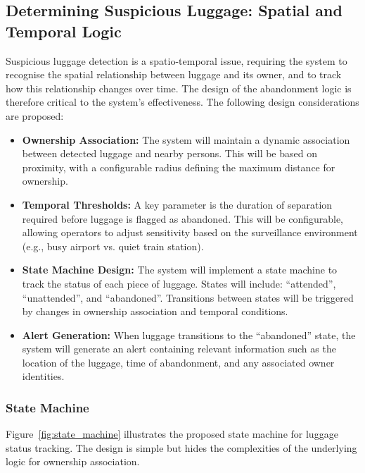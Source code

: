 \subsection{Determining Suspicious Luggage: Spatial and Temporal Logic}

Suspicious luggage detection is a spatio-temporal issue, requiring the system
to recognise the spatial relationship between luggage and its owner, and to
track how this relationship changes over time. The design of the abandonment
logic is therefore critical to the system's effectiveness. The following design
considerations are proposed:

\begin{itemize}
	\item \textbf{Ownership Association:} The system will maintain a dynamic
	      association between detected luggage and nearby persons. This will be
	      based on proximity, with a configurable radius defining the
	      maximum distance for ownership.
	\item \textbf{Temporal Thresholds:} A key parameter is the duration of
	      separation required before luggage is flagged as abandoned. This will be
	      configurable, allowing operators to adjust sensitivity based on the
	      surveillance environment (e.g., busy airport vs. quiet train station).
	\item \textbf{State Machine Design:} The system will implement a state machine
	      to track the status of each piece of luggage. States will include:
	      \enquote{attended}, \enquote{unattended}, and \enquote{abandoned}. Transitions
	      between states will be triggered by changes in ownership association and
	      temporal conditions.
	\item \textbf{Alert Generation:} When luggage transitions to the \enquote{abandoned}
	      state, the system will generate an alert containing relevant information such as
	      the location of the luggage, time of abandonment, and any associated owner identities.
\end{itemize}

\subsubsection{State Machine}
\label{sec:state_machine_logic}

Figure~\ref{fig:state_machine} illustrates the proposed state machine for
luggage status tracking. The design is simple but hides the complexities of the
underlying logic for ownership association.

